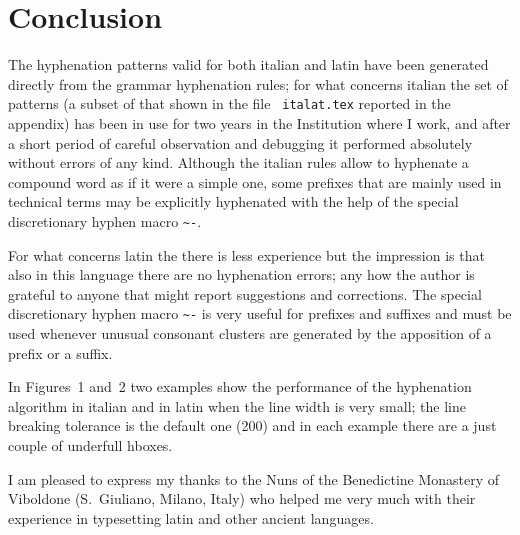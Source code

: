 \documentclass{ltugboat}
\begin{document}
\section{Conclusion}
The  hyphenation  patterns  valid  for  both  italian  and  latin  have been
generated directly from the grammar hyphenation  rules;  for  what  concerns
italian  the  set  of  patterns  (a  subset  of  that shown in the file {\tt
italat.tex} reported in the appendix) has been in use for two years  in  the
Institution  where  I  work, and after a short period of careful observation
and debugging it performed absolutely without errors of any  kind.  Although
the  italian rules allow to hyphenate a compound word as if it were a simple
one, some prefixes that are mainly used in technical terms may be explicitly
hyphenated   with  the  help  of  the  special  discretionary  hyphen  macro
\verb|~-|.

For  what  concerns latin the there is less experience but the impression is
that also in this language there are no  hyphenation  errors;  any  how  the
author  is grateful to anyone that might report suggestions and corrections.
The special discretionary hyphen macro \verb|~-| is very useful for prefixes
and  suffixes  and  must  be  used  whenever  unusual consonant clusters are
generated by the apposition of a prefix or a suffix.


In  Figures~1  and~2  two  examples  show the performance of the hyphenation
algorithm in italian and in latin when the line width  is  very  small;  the
line  breaking  tolerance is the default one (200) and in each example there
are a just couple of underfull hboxes.

I  am  pleased to express my thanks to the Nuns of the Benedictine Monastery
of Viboldone (S.~Giuliano, Milano, Italy) who helped me very much with their
experience in typesetting latin and other ancient languages.




\appendix
\onecolumn
\end{document}
